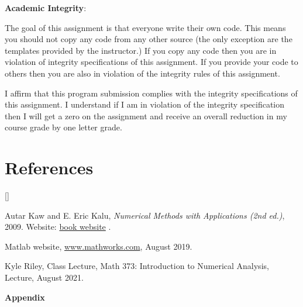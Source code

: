 \documentclass{article}
\def\beginrefs{\begin{list}%
        {[\arabic{equation}]}{\usecounter{equation}
         \setlength{\leftmargin}{2.0truecm}\setlength{\labelsep}{0.4truecm}%
         \setlength{\labelwidth}{1.6truecm}}}
\def\endrefs{\end{list}}
\def\bibentry#1{\item[\hbox{[#1]}]}
\begin{document}
{\bf Academic Integrity}: {\color{black} The goal of this assignment is that everyone write their own code. This means you should not copy any code from any other source (the only exception are the templates provided by the instructor.) If you copy any code then you are in violation of integrity specifications of this assignment. If you provide your code to others then you are also in violation of the integrity rules of this assignment. 

I affirm that this program submission complies with the integrity specifications of this assignment. I understand if I am in violation of the integrity specification then I will get a zero on the assignment and receive an overall reduction in my course grade by one letter grade.}


\section*{References}
\beginrefs

\bibentry{KK09} {\sc Autar Kaw} and {\sc E. Eric Kalu}, {\it Numerical Methods with Applications (2nd ed.)}, 2009. Website: \href{http://autarkaw.com/books/numericalmethods/index.html}{book website} .

\bibentry{Matlab} {\sc Matlab website}, \href{https://www.mathworks.com}{www.mathworks.com}, August 2019. %

\bibentry{KR21} {\sc Kyle Riley}, Class Lecture, Math 373: Introduction to Numerical Analysis, Lecture, August 2021. 

\endrefs

\bigskip \par \bigskip
{\Large {\bf Appendix}} \par \medskip
\end{document}
